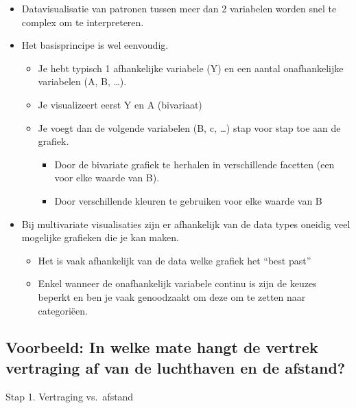 \documentclass[]{tufte-book}
\providecommand{\tightlist}{%
  \setlength{\itemsep}{0pt}\setlength{\parskip}{0pt}}
\begin{document}
\begin{itemize}
\tightlist
\item
  Datavisualisatie van patronen tussen meer dan 2 variabelen worden snel te complex om te interpreteren.
\item
  Het basisprincipe is wel eenvoudig.

  \begin{itemize}
  \tightlist
  \item
    Je hebt typisch 1 afhankelijke variabele (Y) en een aantal onafhankelijke variabelen (A, B, \ldots).
  \item
    Je visualizeert eerst Y en A (bivariaat)
  \item
    Je voegt dan de volgende variabelen (B, c, \ldots) stap voor stap toe aan de grafiek.

    \begin{itemize}
    \tightlist
    \item
      Door de bivariate grafiek te herhalen in verschillende facetten (een voor elke waarde van B).
    \item
      Door verschillende kleuren te gebruiken voor elke waarde van B
    \end{itemize}
  \end{itemize}
\item
  Bij multivariate visualisaties zijn er afhankelijk van de data types oneidig veel mogelijke grafieken die je kan maken.

  \begin{itemize}
  \tightlist
  \item
    Het is vaak afhankelijk van de data welke grafiek het ``best past''
  \item
    Enkel wanneer de onafhankelijk variabele continu is zijn de keuzes beperkt en ben je vaak genoodzaakt om deze om te zetten naar categoriëen.
  \end{itemize}
\end{itemize}

\hypertarget{voorbeeld-in-welke-mate-hangt-de-vertrek-vertraging-af-van-de-luchthaven-en-de-afstand}{%
\subsection{Voorbeeld: In welke mate hangt de vertrek vertraging af van de luchthaven en de afstand?}\label{voorbeeld-in-welke-mate-hangt-de-vertrek-vertraging-af-van-de-luchthaven-en-de-afstand}}

Stap 1. Vertraging vs.~afstand
\end{document}
